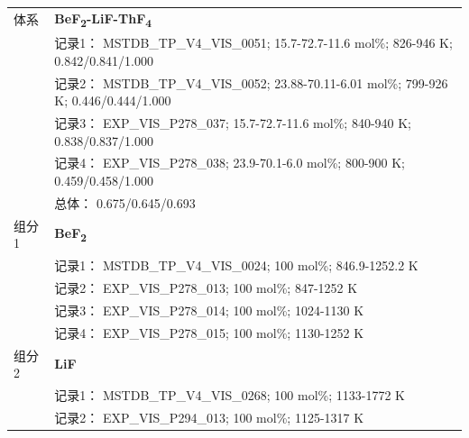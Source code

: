 \documentclass[12pt]{article}
\begin{document}
{\begin{longtable}[]{@{}
  >{\raggedright\arraybackslash}p{}
  >{\raggedright\arraybackslash}p{}@{}}
\midrule
体系 & \textbf{BeF\textsubscript{2}-LiF-ThF\textsubscript{4}} \\
 & 记录1： MSTDB\_TP\_V4\_VIS\_0051; 15.7-72.7-11.6 mol\%; 826-946 K; 0.842/0.841/1.000 \\
 & 记录2： MSTDB\_TP\_V4\_VIS\_0052; 23.88-70.11-6.01 mol\%; 799-926 K; 0.446/0.444/1.000 \\
 & 记录3： EXP\_VIS\_P278\_037; 15.7-72.7-11.6 mol\%; 840-940 K; 0.838/0.837/1.000 \\
 & 记录4： EXP\_VIS\_P278\_038; 23.9-70.1-6.0 mol\%; 800-900 K; 0.459/0.458/1.000 \\
 & 总体： 0.675/0.645/0.693  \\

组分 1  & \textbf{BeF\textsubscript{2}} \\
 & 记录1： MSTDB\_TP\_V4\_VIS\_0024; 100 mol\%; 846.9-1252.2 K \\
 & 记录2： EXP\_VIS\_P278\_013; 100 mol\%; 847-1252 K \\
 & 记录3： EXP\_VIS\_P278\_014; 100 mol\%; 1024-1130 K \\
 & 记录4： EXP\_VIS\_P278\_015; 100 mol\%; 1130-1252 K  \\

组分 2  & \textbf{LiF} \\
 & 记录1： MSTDB\_TP\_V4\_VIS\_0268; 100 mol\%; 1133-1772 K \\
 & 记录2： EXP\_VIS\_P294\_013; 100 mol\%; 1125-1317 K  \\


\end{longtable}}
\end{document}

